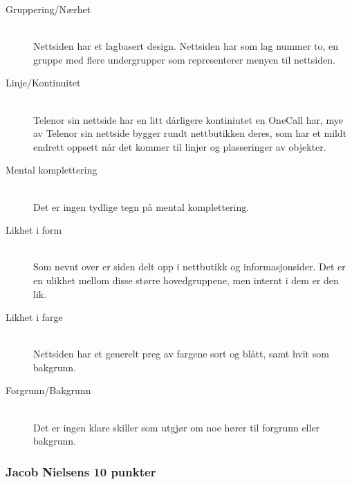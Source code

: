 \documentclass[a4paper, 10pt]{article}
\begin{document}
\begin{description}
  \item[Gruppering/Nærhet] \hfill \\
    Nettsiden har et lagbasert design. Nettsiden har som lag nummer to, en gruppe med flere undergrupper som representerer menyen til nettsiden.
  \item[Linje/Kontinuitet] \hfill \\
    Telenor sin nettside har en litt dårligere kontiniutet en OneCall har, mye av Telenor sin nettside bygger rundt nettbutikken deres, som har et mildt endrett oppsett når det kommer til linjer og plasseringer av objekter.
  \item[Mental komplettering] \hfill \\
    Det er ingen tydlige tegn på mental komplettering.  
  \item[Likhet i form] \hfill \\
    Som nevnt over er siden delt opp i nettbutikk og informasjonsider. Det er en ulikhet mellom disse større hovedgruppene, men internt i dem er den lik.
  \item[Likhet i farge] \hfill \\
    Nettsiden har et generelt preg av fargene sort og blått, samt hvit som bakgrunn.
  \item[Forgrunn/Bakgrunn] \hfill \\
    Det er ingen klare skiller som utgjør om noe hører til forgrunn eller bakgrunn.
\end{description}

\subsubsection*{Jacob Nielsens 10 punkter}
\end{document}
